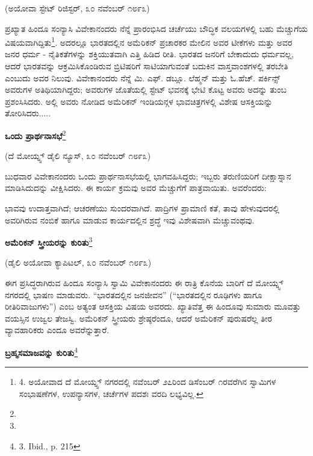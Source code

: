 (ಅಯೋವಾ ಸ್ಟೇಟ್ ರಿಜಿಸ್ಟರ್, ೩೦ ನವೆಂಬರ್ ೧೮೯೩)

ಪ್ರಖ್ಯಾತ ಹಿಂದೂ ಸಂನ್ಯಾಸಿ ವಿವೇಕಾನಂದರು ನೆನ್ನೆ ಪ್ರಾರಂಭಿಸಿದ ಚರ್ಚೆಯು ಬೌದ್ಧಿಕ ವಲಯಗಳಲ್ಲಿ ಬಹು ಮೆಚ್ಚುಗೆಯ ವಿಷಯವಾಗಿದ್ದಿತು\footnote{4. ಅಯೋವಾದ ದೆ ಮೋಯ್ನ್ಸ್ ನಗರದಲ್ಲಿ ನವೆಂಬರ್ ೨೭ರಿಂದ ಡಿಸೆಂಬರ್ ೧ರವರೆಗಿನ ಸ್ವಾಮಿಗಳ ಸಂಭಾಷಣೆಗಳ, ಉಪನ್ಯಾಸಗಳ, ಚರ್ಚೆಗಳ ಪದಶಃ ವರದಿ ಲಭ್ಯವಿಲ್ಲ.}. ಅದರಲ್ಲೂ ಭಾರತದಲ್ಲಿನ ಅಮೆರಿಕನ್ ಪ್ರಚಾರಕರ ಮೇಲಿನ ಅವರ ಟೀಕೆಗಳು ಮತ್ತು ಅವರ ಜನರ ಧರ್ಮ - ನೈತಿಕತೆಗಳನ್ನು ಶಕ್ತಿಯುತವಾಗಿ ಎತ್ತಿ ಹಿಡಿದ ರೀತಿ. ಭಾರತದ ಜನರಿಗೆ ಬೇಕಾದುದು ಧರ್ಮವಲ್ಲ, ಆದರೆ ಭಾರತವನ್ನು ಆಕ್ರಮಿಸಿಕೊಂಡಿರುವ ಬ್ರಿಟಿಷರಿಗೆ ಸಾಟಿಯಾಗುವಂತೆ ಬದುಕಿನ ವಾಸ್ತವಾಂಶಗಳಲ್ಲಿ ತರಬೇತಿ ಎಂಬುದು ಅವರ ನಿಲುವು. ವಿವೇಕಾನಂದರು ನೆನ್ನೆ ಮಿ. ಎಫ್. ಡಬ್ಲೂ. ಲೆಹ್ಮನ್ ಮತ್ತು ಓ.ಹೆಚ್. ಪರ್ಕಿನ್ಸ್ ಅವರುಗಳ ಅತಿಥಿಯಾಗಿದ್ದರು; ಅವರುಗಳ ಜೊತೆಯಲ್ಲಿ ಸ್ಟೇಟ್ ಭವನಕ್ಕೆ ಭೇಟಿ ಕೊಟ್ಟ ಅವರು ಅದನ್ನು ತುಂಬ ಪ್ರಶಂಸಿಸಿದರು. ಅಲ್ಲಿ ಅವರು ನೋಡಿದ ಅಮೆರಿಕನ್ ಇಂಡಿಯನ್ಗಳ ಭಾವಚಿತ್ರಗಳಲ್ಲಿ ವಿಶೇಷ ಆಸಕ್ತಿಯನ್ನು ತೋರಿಸಿದರು.....

\begin{center}
\textbf{ಒಂದು ಪ್ರಾರ್ಥನಾಸಭೆ}\footnote{}
\end{center}

\begin{center}
(ದೆ ಮೋಯ್ನ್ಸ್ ಡೈಲಿ ನ್ಯೂಸ್, ೩೦ ನವೆಂಬರ್ ೧೮೯೩)
\end{center}

ಬುಧವಾರ ವಿವೇಕಾನಂದರು ಒಂದು ಪ್ರಾರ್ಥನಾಸಭೆಯಲ್ಲಿ ಭಾಗವಹಿಸಿದ್ದರು; ಇಬ್ಬರು ತರುಣಿಯರಿಗೆ ದೀಕ್ಷಾಸ್ನಾನ ಮಾಡಿಸಿದುದನ್ನು ವೀಕ್ಷಿಸಿದರು. ಈ ಕಾರ್ಯ ಕ್ರಮವು ಅವರ ಮೆಚ್ಚುಗೆಗೆ ಪಾತ್ರವಾಯಿತು. ಅವರೆಂದರು:

ಭಾವವು ಉದಾತ್ತವಾಗಿದೆ; ಆಚರಣೆಯು ಸುಂದರವಾಗಿದೆ. ಪಾದ್ರಿಗಳ ಪ್ರಾಮಾಣಿ ಕತೆ, ತಾವು ಹೇಳುವುದರಲ್ಲಿ ಅವರಿಗಿರುವ ನಂಬಿಕೆ ಹಾಗೂ ಮಾಡುವ ಕಾರ್ಯದಲ್ಲಿನ ಶ್ರದ್ಧೆ ಇವು ವಿಶೇಷವಾಗಿ ಮೆಚ್ಚುವಂಥವು.

\begin{center}
\textbf{ಅಮೆರಿಕನ್ ಸ್ತ್ರೀಯರನ್ನು ಕುರಿತು}\footnote{}
\end{center}

\begin{center}
(ಡೈಲಿ ಅಯೋವಾ ಕ್ಯಾಪಿಟಲ್, ೩೦ ನವೆಂಬರ್ ೧೮೯೩)
\end{center}

ಈಗ ಪ್ರಸಿದ್ಧರಾಗಿರುವ ಹಿಂದೂ ಸಂನ್ಯಾಸಿ ಸ್ವಾಮಿ ವಿವೇಕಾನಂದರು ಈ ರಾತ್ರಿ ಕೊನೆಯ ಬಾರಿಗೆ ದೆ ಮೋಯ್ನ್ಸ್ ನಗರದಲ್ಲಿ ಭಾಷಣ ಮಾಡುವರು. “ಭಾರತದಲ್ಲಿನ ಜನಜೀವನ” (“ಭಾರತದಲ್ಲಿನ ರೂಢಿಗಳು ಹಾಗೂ ರೀತಿರಿವಾಜುಗಳು”) ಎಂಬ ಅತ್ಯಂತ ಆಸಕ್ತಿಯ ವಿಷಯ ಅವರದು. ಖ್ಯಾತಿವೆತ್ತ ಈ ಹಿಂದೂವು ಸುಮಾರು ಮೂವತ್ತು ವಯಸ್ಸಿನ ಉಜ್ವಲ ತೇಜಸ್ವಿ. ಅಮೆರಿಕನ್ ಸ್ತ್ರೀಯರು ಶ್ರೇಷ್ಠರೆಂದೂ, ಆದರೆ ಅಮೆರಿಕನ್ ಪುರುಷರೆಲ್ಲ ತೀರ ವ್ಯಾವಹಾರಿಕರು ಎಂದೂ ಅವರೆನ್ನುತ್ತಾರೆ.

\begin{center}
\textbf{ಬ್ರಹ್ಮಸಮಾಜವನ್ನು ಕುರಿತು}\footnote{3. Ibid., p. 215}
\end{center}

